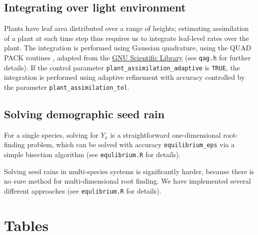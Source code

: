 \documentclass[10pt,twoside]{article}
\begin{document}
\subsection{Integrating over light
environment}\label{integrating-over-light-environment}

Plants have leaf area distributed over a range of heights; estimating
assimilation of a plant at each time step thus requires us to integrate
leaf-level rates over the plant. The integration is performed using
Gaussian quadrature, using the QUAD PACK routines \citep{Piessens-1983},
adapted from the \href{http://www.gnu.org/software/gsl/}{GNU Scientific
Library}\citep{Galassi-2009} (see \texttt{qag.h} for further details).
If the control parameter \texttt{plant\_assimilation\_adaptive} is \texttt{TRUE},
the integration is performed using adaptive refinement with accuracy
controlled by the parameter \texttt{plant\_assimilation\_tol}.

\subsection{Solving demographic seed
rain}\label{solving-demographic-seed-rain}

For a single species, solving for \(Y_x\) is a straightforward
one-dimensional root-finding problem, which can be solved with accuracy
\texttt{equilibrium\_eps} via a simple bisection algorithm (see
\texttt{equlibrium.R} for details).

Solving seed rains in multi-species systems is significantly harder,
because there is no sure method for multi-dimensional root finding. We
have implemented several different approaches (see
\texttt{equlibrium.R} for details).


\clearpage

\section{Tables}\label{tables}
\end{document}
